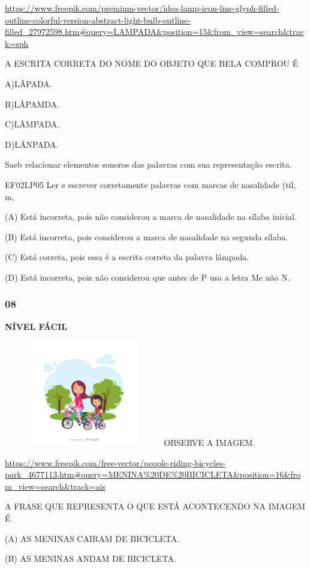 \url{https://www.freepik.com/premium-vector/idea-lamp-icon-line-glyph-filled-outline-colorful-version-abstract-light-bulb-outline-filled_27972598.htm\#query=LAMPADA\&position=15\&from_view=search\&track=sph}

A ESCRITA CORRETA DO NOME DO OBJETO QUE BELA COMPROU É

A)LÂPADA.

B)LÂPAMDA.

C)LÂMPADA.

D)LÂNPADA.

Saeb relacionar elementos sonoros das palavras com sua representação
escrita.

EF02LP05 Ler e escrever corretamente palavras com marcas de nasalidade
(til, m,

(A) Está incorreta, pois não considerou a marca de nasalidade na sílaba
inicial.

(B) Está incorreta, pois considerou a marca de nasalidade na segunda
sílaba.

(C) Está correta, pois essa é a escrita correta da palavra lâmpada.

(D) Está incorreta, pois não considerou que antes de P usa a letra Me
não N.

\subsubsection{08}\label{section-150}

\textbf{NÍVEL FÁCIL}

\includegraphics[width=2.76266in,height=1.82051in]{media/image179.png}OBSERVE
A IMAGEM.

\url{https://www.freepik.com/free-vector/people-riding-bicycles-park_4677113.htm\#query=MENINA\%20DE\%20BICICLETA\&position=16\&from_view=search\&track=ais}

A FRASE QUE REPRESENTA O QUE ESTÁ ACONTECENDO NA IMAGEM É

(A) AS MENINAS CAIRAM DE BICICLETA.

(B) AS MENINAS ANDAM DE BICICLETA.

